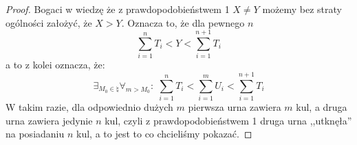 \begin{proof}
	Bogaci w wiedzę że z prawdopodobieństwem 1 \(X \not = Y\) możemy bez straty ogólności założyć, że \( X > Y \). Oznacza to, że dla pewnego \( n \)
	\[
		\sum_{i=1}^n T_i < Y < \sum_{i=1}^{n+1} T_i
	\]
	a to z kolei oznacza, że:
	\[
		\exists_{M_0 \in \natural} \forall_{m > M_0}: \; \sum_{i=1}^n T_i < \sum_{i=1}^m U_i < \sum_{i=1}^{n+1} T_i
	\]
	W takim razie, dla odpowiednio dużych \( m \) pierwsza urna zawiera \( m \) kul, a druga urna zawiera jedynie \( n \) kul, czyli z prawdopodobieństwem 1 druga urna ,,utknęła'' na posiadaniu \( n \) kul, a to jest to co chcieliśmy pokazać.
\end{proof}
